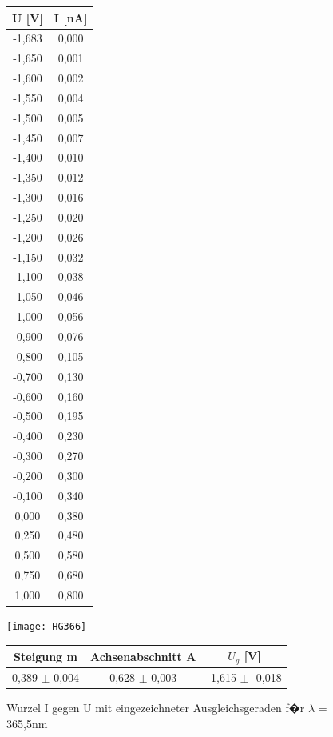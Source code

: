 \documentclass[a4paper, 10pt]{report}%
\begin{document}
\begin{figure}[!htbp]
\begin{minipage}[t]{2cm}
\vspace{0pt}
\centering
\begin{center}
\begin{tabular}{c|c}
U [V] & I [nA] \\
\hline
-1,683&	0,000 \\
-1,650&	0,001 \\
-1,600&	0,002 \\
-1,550&	0,004 \\
-1,500&	0,005 \\
-1,450&	0,007 \\
-1,400&	0,010 \\
-1,350&	0,012 \\
-1,300&	0,016 \\
-1,250&	0,020 \\
-1,200&	0,026 \\
-1,150&	0,032 \\
-1,100&	0,038 \\
-1,050&	0,046 \\
-1,000&	0,056 \\
-0,900&	0,076 \\
-0,800&	0,105 \\
-0,700&	0,130 \\
-0,600&	0,160 \\
-0,500&	0,195 \\
-0,400&	0,230 \\
-0,300&	0,270 \\
-0,200&	0,300 \\
-0,100&	0,340 \\
0,000&	0,380 \\
0,250&	0,480 \\
0,500&	0,580 \\
0,750&	0,680 \\
1,000&	0,800
\end{tabular}
\end{center}
\end{minipage}
\hfill
\begin{minipage}[t]{12cm}
\vspace{0pt}
\texttt{[image: HG366]}
\caption{Wurzel I gegen U mit eingezeichneter Ausgleichsgeraden f�r $\lambda$ = 365,5nm}
\begin{center}
\begin{tabular}{c|c|c}
Steigung m & Achsenabschnitt A & $U_g$ [V]\\
\hline
0,389 $\pm$ 0,004 & 0,628 $\pm$	0,003 & -1,615 $\pm$ -0,018
\end{tabular}
\end{center}
\end{minipage}
\end{figure}
	
\end{document}
